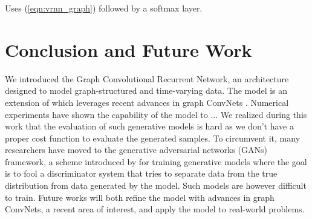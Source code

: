 \documentclass{article} %
\newcommand{\eqnref}[1]{(\ref{eqn:#1})}
\newcommand{\todo}[1]{{\color{red} #1 }}
\begin{document}
Uses \eqnref{vrnn_graph} followed by a softmax layer.

\section{Conclusion and Future Work}

We introduced the Graph Convolutional Recurrent Network, an architecture
designed to model graph-structured and time-varying data. The model is an
extension of \citet{convlstm} which leverages recent advances in graph ConvNets
\citep{gcnn}. Numerical experiments have shown the capability of the model
\todo{to ...}
We realized during this work that the evaluation of such generative models is hard as we don't have a proper cost function to evaluate the generated samples. To circumvent it, many researchers have moved to the generative adversarial networks (GANs) framework, a scheme introduced by \citet{gan} for training generative models where the goal is to fool a discriminator system that tries to separate data from the true distribution from data generated by the model. Such models are however difficult to train.
Future works will both refine the model with advances in graph ConvNets, a recent area of interest, and apply the model to real-world problems.


\newpage


\end{document}
